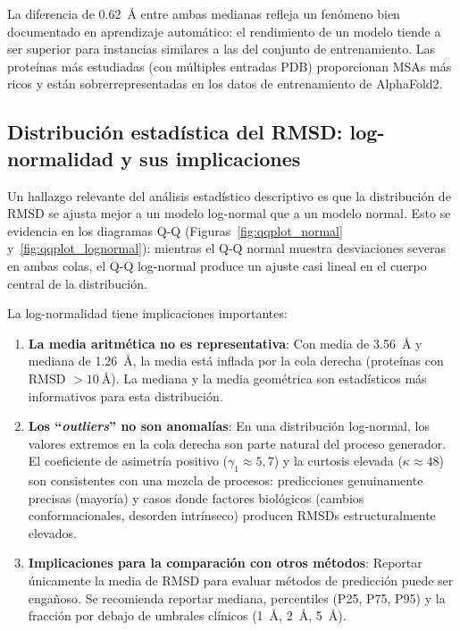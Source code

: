 La diferencia de \SI{0,62}{\angstrom} entre ambas medianas refleja un fen\'omeno bien
documentado en aprendizaje autom\'atico: el rendimiento de un modelo tiende a ser superior
para instancias similares a las del conjunto de entrenamiento. Las prote\'inas m\'as
estudiadas (con m\'ultiples entradas PDB) proporcionan MSAs m\'as ricos y est\'an
sobrerrepresentadas en los datos de entrenamiento de AlphaFold2.

\subsection{Distribuci\'on estad\'istica del RMSD: log-normalidad y sus implicaciones}
\label{subsec:distribucion_rmsd}

Un hallazgo relevante del an\'alisis estad\'istico descriptivo es que la distribuci\'on
de RMSD se ajusta mejor a un modelo log-normal que a un modelo normal. Esto se evidencia
en los diagramas Q-Q (Figuras~\ref{fig:qqplot_normal} y~\ref{fig:qqplot_lognormal}):
mientras el Q-Q normal muestra desviaciones severas en ambas colas, el Q-Q log-normal
produce un ajuste casi lineal en el cuerpo central de la distribuci\'on.

La log-normalidad tiene implicaciones importantes:

\begin{enumerate}
    \item \textbf{La media aritm\'etica no es representativa}: Con media de
    \SI{3,56}{\angstrom} y mediana de \SI{1,26}{\angstrom}, la media est\'a inflada por la
    cola derecha (prote\'inas con RMSD $> \SI{10}{\angstrom}$). La mediana y la media
    geom\'etrica son estad\'isticos m\'as informativos para esta distribuci\'on.

    \item \textbf{Los ``\textit{outliers}'' no son anomal\'ias}: En una distribuci\'on log-normal,
    los valores extremos en la cola derecha son parte natural del proceso generador.
    El coeficiente de asimetr\'ia positivo ($\gamma_1 \approx 5,7$) y la curtosis elevada
    ($\kappa \approx 48$) son consistentes con una mezcla de procesos: predicciones
    genuinamente precisas (mayor\'ia) y casos donde factores biol\'ogicos (cambios
    conformacionales, desorden intr\'inseco) producen RMSDs estructuralmente elevados.

    \item \textbf{Implicaciones para la comparaci\'on con otros m\'etodos}: Reportar
    \'unicamente la media de RMSD para evaluar m\'etodos de predicci\'on puede ser
    enga\~noso. Se recomienda reportar mediana, percentiles (P25, P75, P95) y la
    fracci\'on por debajo de umbrales cl\'inicos (\SI{1}{\angstrom}, \SI{2}{\angstrom},
    \SI{5}{\angstrom}).
\end{enumerate}

